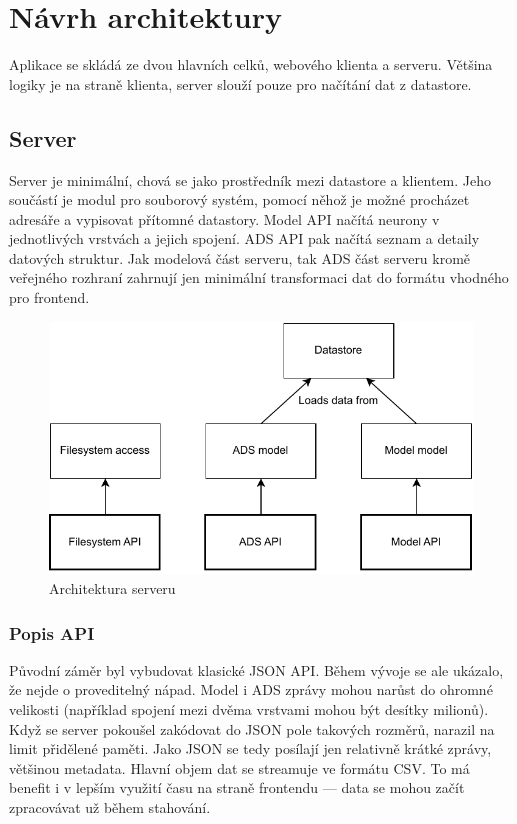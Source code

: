 \chapter{Návrh architektury}
\label{chap:architecture}

Aplikace se skládá ze dvou hlavních celků, webového klienta a serveru. Většina logiky je na straně klienta, server slouží pouze pro načítání dat z datastore.

\section{Server}

Server je minimální, chová se jako prostředník mezi datastore a klientem. Jeho součástí je modul pro souborový systém, pomocí něhož je možné procházet adresáře a vypisovat přítomné datastory. Model API načítá neurony v jednotlivých vrstvách a jejich spojení. ADS API pak načítá seznam a detaily datových struktur. Jak modelová část serveru, tak ADS část serveru kromě veřejného rozhraní zahrnují jen minimální transformaci dat do formátu vhodného pro frontend.

\begin{figure}
  \centering
  \includegraphics[width=.7\linewidth]{img/server_diagram.pdf}
  \caption{Architektura serveru}
\end{figure}

\subsection{Popis API}

Původní záměr byl vybudovat klasické JSON API. Během vývoje se ale ukázalo, že nejde o proveditelný nápad. Model i ADS zprávy mohou narůst do ohromné velikosti (například spojení mezi dvěma vrstvami mohou být desítky milionů). Když se server pokoušel zakódovat do JSON pole takových rozměrů, narazil na limit přidělené paměti. Jako JSON se tedy posílají jen relativně krátké zprávy, většinou metadata. Hlavní objem dat se streamuje ve formátu CSV. To má benefit i v lepším využití času na straně frontendu --- data se mohou začít zpracovávat už během stahování.


